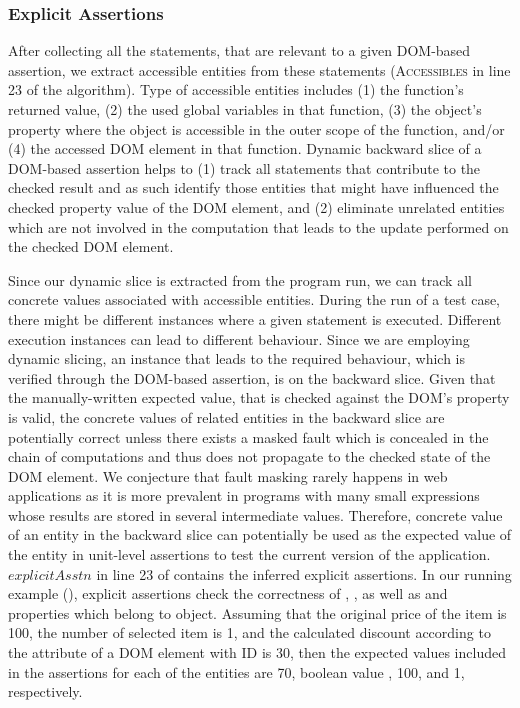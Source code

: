 \subsubsection{Explicit Assertions} \label{Sec:explicitAssertions}
After collecting all the statements, that are relevant to a given DOM-based assertion, we extract accessible entities from these statements (\textsc{Accessibles} in line 23 of the algorithm).
Type of accessible entities includes (1) the function's returned value, (2) the used global variables in that function, (3) the object's property where the object is accessible in the outer scope of the function, and/or (4) the accessed DOM element in that function. Dynamic backward slice of a DOM-based assertion helps to (1) track all statements that contribute to the checked result and as such identify those entities that might have influenced the checked property value of the DOM element, and (2) eliminate unrelated entities which are not involved in the computation that leads to the update performed on the checked DOM element.

Since our dynamic slice is extracted from the program run, we can track all concrete values associated with accessible entities.
During the run of a test case, there might be different instances where a given statement is executed. Different execution instances can lead to different behaviour. Since we are employing dynamic slicing, an instance that leads to the required behaviour, which is verified through the DOM-based assertion, is on the backward slice. Given that the manually-written expected value, that is checked against the DOM's property is valid, the concrete values of related entities in the backward slice are potentially correct unless there exists a masked fault which is concealed in the chain of computations and thus does not propagate to the checked state of the DOM element. We conjecture that fault masking rarely happens in \javascript web applications as it is more prevalent in programs with many small expressions whose results are stored in several intermediate values. Therefore, concrete value of an entity in the backward slice can potentially be used as the expected value of the entity in unit-level assertions to test the current version of the application.
$explicitAsstn$ in line 23 of  contains the inferred explicit assertions.
In our running example (), explicit assertions check the correctness of , , as well as  and  properties which belong to  object.  
Assuming that the original price of the item is 100, the number of selected item is 1, and the calculated discount according to the  attribute of a DOM element with ID  is 30, then the expected values included in the assertions for each of the entities are 70, boolean value , 100, and 1, respectively.  

